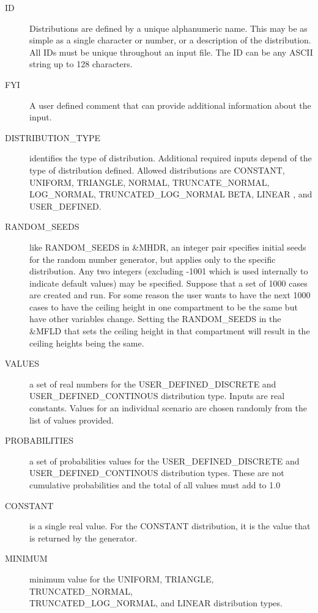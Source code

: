 \documentclass[12pt,twoside]{book}
\begin{document}
\begin{description}
  \item[ID] Distributions are defined by a unique alphanumeric name. This may be as simple as a single character or number, or a description of the distribution. All IDs must be unique throughout an input file. The { \ct ID} can be any ASCII string up to 128 characters.
  \item[FYI] A user defined comment that can provide additional information about the input.
  \item[DISTRIBUTION\_TYPE] identifies the type of distribution. Additional required inputs depend of the type of distribution defined. Allowed distributions are {\ct CONSTANT},  {\ct UNIFORM}, {\ct TRIANGLE}, {\ct NORMAL}, {\ct TRUNCATE\_NORMAL}, {\ct LOG\_NORMAL}, {\ct TRUNCATED\_LOG\_NORMAL} {\ct BETA}, {\ct LINEAR }, and {\ct USER\_DEFINED}.
  \item[RANDOM\_SEEDS] like {\ct RANDOM\_SEEDS} in {\ct \&MHDR}, an integer pair specifies initial seeds for the random number generator, but applies only to the specific distribution. Any two integers (excluding -1001 which is used internally to indicate default values) may be specified. Suppose that a set of 1000 cases are created and run. For some reason the user wants to have the next 1000 cases to have the ceiling height in one compartment to be the same but have other variables change. Setting the {\ct RANDOM\_SEEDS} in the {\ct \&MFLD} that sets the ceiling height in that compartment will result in the ceiling heights being the same. 
  \item[VALUES] a set of real numbers for the {\ct USER\_DEFINED\_DISCRETE} and \\
{\ct USER\_DEFINED\_CONTINOUS} distribution type. Inputs are real constants. Values for an individual scenario are chosen randomly from the list of values provided.
  \item[PROBABILITIES] a set of probabilities values for the {\ct USER\_DEFINED\_DISCRETE} and \\
 { \ct USER\_DEFINED\_CONTINOUS} distribution types. These are not cumulative probabilities and the total of all values must add to 1.0
  \item[CONSTANT] is a single real value. For the {\ct CONSTANT} distribution, it is the value that is returned by the generator.
  \item[MINIMUM] minimum value for the {\ct UNIFORM}, {\ct TRIANGLE}, {\ct TRUNCATED\_NORMAL}, \\
  {\ct TRUNCATED\_LOG\_NORMAL}, and {\ct LINEAR} distribution types.

\end{description}
\end{document}
